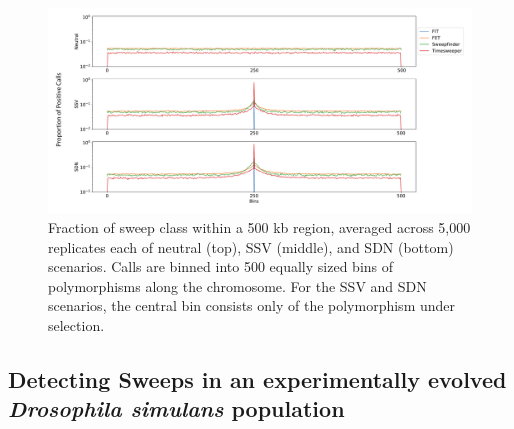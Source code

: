 \begin{figure}
    \centering
    \includegraphics[width=\textwidth]{figures/ch1/Figure_5.pdf}
    \caption[Timesweeper localization performance]{Fraction of sweep class within a 500 kb region, averaged across 5,000 replicates each of neutral (top), SSV (middle), and SDN (bottom) scenarios. Calls are binned into 500 equally sized bins of polymorphisms along the chromosome. For the SSV and SDN scenarios, the central bin consists only of the polymorphism under selection.}
    \label{fig:enter-label}
\end{figure}



\subsection{Detecting Sweeps in an experimentally evolved \textit{Drosophila simulans} population}

